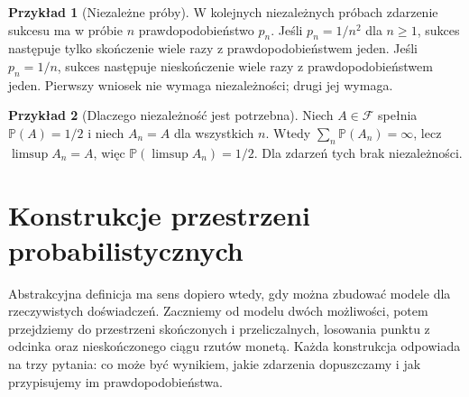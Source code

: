 \documentclass[11pt,a4paper,oneside]{report}
\numberwithin{equation}{chapter}
\theoremstyle{plain}
\theoremstyle{definition}
\newtheorem{przyklad}{Przykład}[chapter]
\theoremstyle{remark}
\newcommand{\Prob}{\mathbb{P}}
\begin{document}
\begin{przyklad}[Niezależne próby]
W kolejnych niezależnych próbach zdarzenie sukcesu ma w próbie $n$
prawdopodobieństwo $p_n$. Jeśli $p_n=1/n^2$ dla $n\geq1$,
sukces następuje tylko skończenie wiele razy z prawdopodobieństwem jeden.
Jeśli $p_n=1/n$, sukces następuje nieskończenie wiele razy
z prawdopodobieństwem jeden. Pierwszy wniosek nie wymaga niezależności;
drugi jej wymaga.
\end{przyklad}

\begin{przyklad}[Dlaczego niezależność jest potrzebna]
Niech $A\in\mathcal F$ spełnia $\Prob(A)=1/2$ i niech $A_n=A$
dla wszystkich $n$. Wtedy $\sum_n\Prob(A_n)=\infty$,
lecz $\limsup A_n=A$, więc $\Prob(\limsup A_n)=1/2$.
Dla zdarzeń tych brak niezależności.
\end{przyklad}

\section{Konstrukcje przestrzeni probabilistycznych}
Abstrakcyjna definicja ma sens dopiero wtedy, gdy można zbudować
modele dla rzeczywistych doświadczeń. Zaczniemy od modelu dwóch
możliwości, potem przejdziemy do przestrzeni skończonych i
przeliczalnych, losowania punktu z odcinka oraz nieskończonego
ciągu rzutów monetą. Każda konstrukcja odpowiada na trzy pytania:
co może być wynikiem, jakie zdarzenia dopuszczamy i jak przypisujemy
im prawdopodobieństwa.
\end{document}
